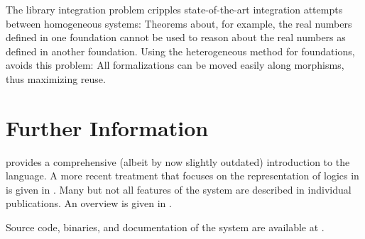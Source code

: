 The library integration problem cripples state-of-the-art integration attempts between homogeneous systems: Theorems about, for example, the real numbers defined in one foundation cannot be used to reason about the real numbers as defined in another foundation. Using the heterogeneous method for foundations, {\pn} avoids this problem: All formalizations can be moved easily along morphisms, thus maximizing reuse.

\section{Further Information}\label{sec:conc}

\cite{RK:mmt:10} provides a comprehensive (albeit by now slightly outdated) introduction to the \mmt language.
A more recent treatment that focuses on the representation of logics in \mmt is given in \cite{rabe:howto:14}.
Many but not all features of the \mmt system are described in individual publications. An overview is given in \cite{rabe:mmtabs:13}.

Source code, binaries, and documentation of the \mmt system are available at \cite{project:mmt}.